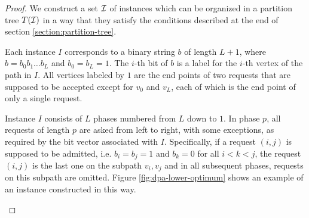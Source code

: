 \begin{proof}
    We construct a set $\mathcal{I}$ of instances which can be organized in a
    partition tree $T(\mathcal{I})$ in a way that they satisfy the conditions
    described at the end of section \ref{section:partition-tree}.

    Each instance $I$ corresponds to a binary string $b$ of length $L+1$,
    where $b = b_0b_1\dots{}b_L$ and $b_0 = b_L = 1$. The $i$-th bit of
    $b$ is a label for the $i$-th vertex of the path in $I$. All vertices
    labeled by $1$ are the end points of two requests that are supposed to
    be accepted except for $v_0$ and $v_L$, each of which is the end
    point of only a single request.

    Instance $I$ consists of $L$ phases numbered from $L$ down to $1$. In
    phase $p$, all requests of length $p$ are asked from left to right,
    with some exceptions, as required by the bit vector associated with
    $I$. Specifically, if a request $(i, j)$ is supposed to be admitted,
    i.e. $b_i = b_j = 1$ and $b_k = 0$ for all $i < k < j$, the request
    $(i, j)$ is the last one on the subpath $v_i, v_j$ and in all
    subsequent phases, requests on this subpath are omitted. Figure
    \ref{fig:dpa-lower-optimum} shows an example of an instance
    constructed in this way.

    \begin{figure}\centering
\end{figure}
\end{proof}
